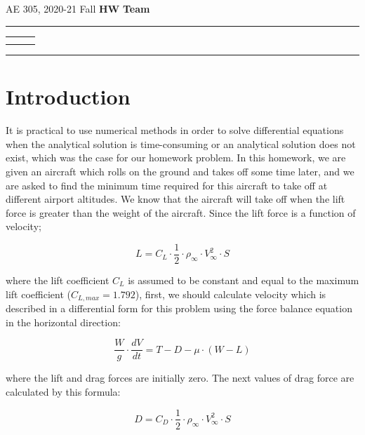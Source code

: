 \documentclass[letterpaper,12pt]{article}
\begin{document}
\begin{center}
AE 305, 2020-21 Fall \hfill \textbf{HW \HWno} \hfill \textbf{Team \TeamNo} \\
\noindent\rule{\textwidth}{0.4pt}
\begin{tabular}{p{} | p{} | p{} }
	\AuthorOneName&\AuthorTwoName&\AuthorThreeName\\
	\textit{\AuthorOneID}&\textit{\AuthorTwoID}&\textit{\AuthorThreeID}
\end{tabular}
\noindent\rule{\textwidth}{0.4pt}
\end{center}


\section{Introduction}

It is practical to use numerical methods in order to solve differential equations when
the analytical solution is time-consuming or an analytical solution does not exist, which was
the case for our homework problem. In this homework, we are given an aircraft
which rolls on the ground and takes off some time later, and we are asked to find
the minimum time required for this aircraft to take off at different airport altitudes.
We know that the aircraft will take off when the lift force is greater than the weight of
the aircraft. Since the lift force is a function of velocity;

\begin{equation}
        L = C_L \cdot \frac{1}{2} \cdot \rho_{\infty} \cdot V_{\infty}^{2} \cdot S
\end{equation}

where the lift coefficient $C_L$ is assumed to be constant and equal to the maximum lift coefficient
($C_{L,max} = 1.792$), first, we should calculate velocity which is described in a differential form for
this problem using the force balance equation in the horizontal direction:

\begin{equation}
        \frac{W}{g} \cdot \frac{dV}{dt} = T - D - \mu \cdot (W - L)
\end{equation}

where the lift and drag forces are initially zero. The next values of drag force are calculated
by this formula:

\begin{equation}
        D = C_D \cdot \frac{1}{2} \cdot \rho_{\infty} \cdot V_{\infty}^{2} \cdot S
\end{equation}
\end{document}
